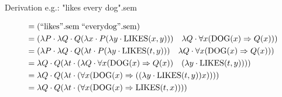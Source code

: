 Derivation e.g.: "likes every dog".sem
\vspace{-0.3cm}
\begin{tiny}
\begin{equation*}
    \begin{aligned}
        &=(\mathrm{``likes".sem \;``every dog".sem}) \\
        &=(\lambda P \cdot \lambda Q \cdot Q(\lambda x \cdot P(\lambda y \cdot \operatorname{LIKES}(x, y))) \quad \lambda Q \cdot \forall x(\mathrm{DOG}(x) \Rightarrow Q(x))) \\
        &=(\lambda P \cdot \lambda Q \cdot Q(\lambda t \cdot P(\lambda y \cdot \mathrm{LIKES}(t, y))) \quad \lambda Q \cdot \forall x(\mathrm{DOG}(x) \Rightarrow Q(x))) \\
        &=\lambda Q \cdot Q(\lambda t \cdot(\lambda Q \cdot \forall x(\mathrm{DOG}(x) \Rightarrow Q(x)) \quad(\lambda y \cdot \operatorname{LIKES}(t, y)))) \\
        &=\lambda Q \cdot Q(\lambda t \cdot(\forall x(\mathrm{DOG}(x) \Rightarrow((\lambda y \cdot \mathrm{LIKES}(t, y)) x)))) \\
        &=\lambda Q \cdot Q(\lambda t \cdot(\forall x(\mathrm{DOG}(x) \Rightarrow \mathrm{LIKES}(t, x))))
    \end{aligned}
\end{equation*}
\end{tiny}
\vspace{-0.4cm}
